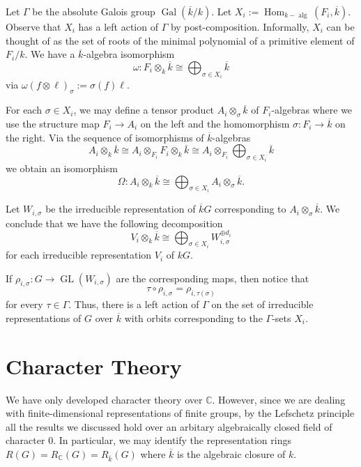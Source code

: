 \documentclass[12pt]{article}
\theoremstyle{plain}
\theoremstyle{definition}
\theoremstyle{remark}
\numberwithin{equation}{section}
\begin{document}
Let $\Gamma$ be the absolute Galois group
$\operatorname{Gal}(\overline{k}/k)$.
Let $X_i :=
\operatorname{Hom}_{k-\operatorname{alg}}(F_i,\overline{k})$.
Observe that $X_i$ has a left action of $\Gamma$ by
post-composition.
Informally, $X_i$ can be thought of as the set of roots of the minimal
polynomial of a primitive element of $F_i/k$.
We have a $\overline{k}$-algebra isomorphism
\[
\omega : F_i \otimes_k \overline{k} \cong
\bigoplus_{\sigma \in X_i} \overline{k}
\]
via $\omega(f \otimes \ell)_{\sigma} := \sigma(f)\ell$.

For each $\sigma \in X_i$, we may define a tensor product
$A_i \otimes_\sigma \overline{k}$ of $F_i$-algebras
where we use the structure map $F_i \to A_i$ on the left and
the homomorphism $\sigma : F_i \to \overline{k}$ on the right.
Via the sequence of isomorphisms of $\overline{k}$-algebras
\[
A_i \otimes_k \overline{k} \cong 
A_i \otimes_{F_i} F_i \otimes_k \overline{k}
\cong A_i \otimes_{F_i} \bigoplus_{\sigma \in X_i} \overline{k}
\]
we obtain an isomorphism
\[
\Omega : A_i \otimes_k \overline{k} \cong
\bigoplus_{\sigma \in X_i} A_i \otimes_\sigma \overline{k} .
\]

Let $W_{i,\sigma}$ be the irreducible representation
of $\overline{k}G$ corresponding to $A_i \otimes_\sigma \overline{k}$.
We conclude that we have the following decomposition
\[
V_i \otimes_k \overline{k} \cong
\bigoplus_{\sigma \in X_i} W_{i,\sigma}^{\oplus d_i}
\]
for each irreducible representation $V_i$ of $kG$.

If $\rho_{i,\sigma} : G \to \operatorname{GL}(W_{i,\sigma})$ are
the corresponding maps, then notice that
\[
\tau \circ \rho_{i,\sigma} = \rho_{i,\tau(\sigma)}
\]
for every $\tau \in \Gamma$.
Thus, there is a left action of $\Gamma$ on the set of irreducible
representations of $G$ over $\overline{k}$
with orbits corresponding to the $\Gamma$-sets $X_i$.

\section{Character Theory}

We have only developed character theory over $\mathbb{C}$.
However, since we are dealing with finite-dimensional representations of
finite groups, by the Lefschetz principle
all the results we discussed hold over an arbitary algebraically closed
field of character $0$.
In particular, we may identify the representation rings
$R(G)=R_{\mathbb{C}}(G)=R_{\overline{k}}(G)$
where $\overline{k}$ is the algebraic closure of $k$.
\end{document}

